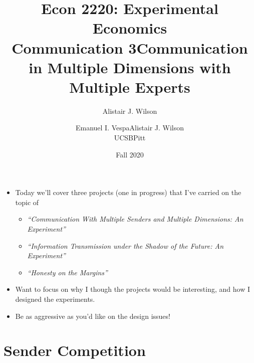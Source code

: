 \documentclass{beamer}
\title{\LARGE Econ 2220: Experimental Economics \\ Communication 3}
\author{Alistair J. Wilson }
\date{Fall 2020}
\begin{document}
\maketitle
\begin{frame}{}
\begin{itemize}
	\item Today we'll cover three projects (one in progress) that I've carried on the topic of
	\begin{itemize}
		\item \textit{``Communication With Multiple Senders and Multiple Dimensions: An Experiment''} 
		\item \textit{``Information Transmission under the Shadow of the Future: An Experiment''}
		\item \textit{``Honesty on the Margins''}
	\end{itemize}
	\item Want to focus on why I though the projects would be interesting, and how I designed the experiments.
	\item Be as aggressive as you'd like on the design issues!
\end{itemize}
\end{frame}




\section{Sender Competition}
\title{\LARGE Communication in Multiple Dimensions with Multiple Experts}
\author{
\begin{tabular}{cc}
	Emanuel I. Vespa & Alistair J. Wilson
	\\ {\tiny{UCSB}} & {\tiny{Pitt}} \\
\end{tabular}
}
\maketitle
\end{document}
